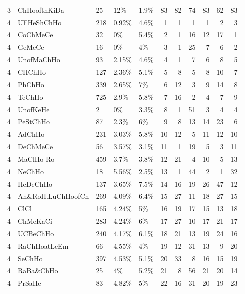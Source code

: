 \begin{longtable}{lllllrrrrrr}
  3 & ChHoofthKiDa & 25 & 12\% & 1.9\% &  83 &  82 &  74 &  83 &  62 &  83 \\ 
  4 & UFHeShChHo & 218 & 0.92\% & 4.6\% &   1 &   1 &   1 &   1 &   2 &   3 \\ 
  4 & CoChMeCe & 32 & 0\% & 5.4\% &   2 &   1 &  16 &  12 &  17 &   1 \\ 
  4 & GeMeCe & 16 & 0\% & 4\% &   3 &   1 &  25 &   7 &   6 &   2 \\ 
  4 & UnofMaChHo & 93 & 2.15\% & 4.6\% &   4 &   1 &   7 &   6 &   8 &   5 \\ 
  4 & CHChHo & 127 & 2.36\% & 5.1\% &   5 &   8 &   5 &   8 &  10 &   7 \\ 
  4 & PhChHo & 339 & 2.65\% & 7\% &   6 &  12 &   3 &   9 &  14 &   8 \\ 
  4 & TeChHo & 725 & 2.9\% & 5.8\% &   7 &  16 &   2 &   4 &   7 &   9 \\ 
  4 & UnofKeHe & 2 & 0\% & 3.3\% &   8 &   1 &  51 &   3 &   4 &   4 \\ 
  4 & PeStChHo & 87 & 2.3\% & 6\% &   9 &   8 &  13 &  14 &  23 &   6 \\ 
  4 & AdChHo & 231 & 3.03\% & 5.8\% &  10 &  12 &   5 &  11 &  12 &  10 \\ 
  4 & DeChMeCe & 56 & 3.57\% & 3.1\% &  11 &   1 &  19 &   5 &   3 &  11 \\ 
  4 & MaClHo-Ro & 459 & 3.7\% & 3.8\% &  12 &  21 &   4 &  10 &   5 &  13 \\ 
  4 & NeChHo & 18 & 5.56\% & 2.5\% &  13 &   1 &  44 &   2 &   1 &  32 \\ 
  4 & HeDeChHo & 137 & 3.65\% & 7.5\% &  14 &  16 &  19 &  26 &  47 &  12 \\ 
  4 & An\&RoH.LuChHoofCh & 269 & 4.09\% & 6.4\% &  15 &  27 &  11 &  18 &  27 &  15 \\ 
  4 & ClCl & 165 & 4.24\% & 5\% &  16 &  19 &  17 &  15 &  13 &  18 \\ 
  4 & ChMeKaCi & 283 & 4.24\% & 6\% &  17 &  27 &  10 &  17 &  21 &  17 \\ 
  4 & UCBeChHo & 240 & 4.17\% & 6.1\% &  18 &  21 &  13 &  19 &  24 &  16 \\ 
  4 & RaChHoatLeEm & 66 & 4.55\% & 4\% &  19 &  12 &  31 &  13 &   9 &  20 \\ 
  4 & SeChHo & 397 & 4.53\% & 5.1\% &  20 &  33 &   8 &  16 &  15 &  19 \\ 
  4 & RaBa\&ChHo & 25 & 4\% & 5.2\% &  21 &   8 &  56 &  21 &  20 &  14 \\ 
  4 & PrSaHe & 83 & 4.82\% & 5\% &  22 &  16 &  31 &  20 &  19 &  23 \\ 

\end{longtable}
